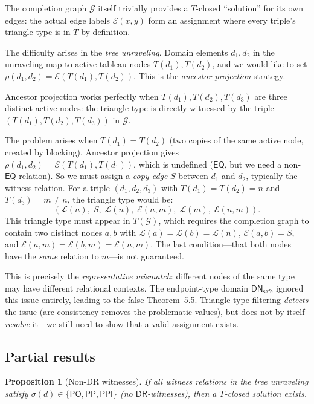 \documentclass[a4paper,11pt]{article}
\newtheorem{proposition}[theorem]{Proposition}
\theoremstyle{definition}
\newcommand{\DR}{\ensuremath{\mathsf{DR}}}
\newcommand{\PO}{\ensuremath{\mathsf{PO}}}
\newcommand{\EQ}{\ensuremath{\mathsf{EQ}}}
\newcommand{\PP}{\ensuremath{\mathsf{PP}}}
\newcommand{\PPI}{\ensuremath{\mathsf{PPI}}}
\newcommand{\DN}{\ensuremath{\mathsf{DN}}}
\begin{document}
The completion graph $\mathcal{G}$ itself trivially provides a
$T$-closed ``solution'' for its own edges: the actual edge labels
$\mathcal{E}(x, y)$ form an assignment where every triple's triangle
type is in $T$ by definition.

The difficulty arises in the \emph{tree unraveling}.  Domain elements
$d_1, d_2$ in the unraveling map to active tableau nodes $T(d_1),
T(d_2)$, and we would like to set $\rho(d_1, d_2) = \mathcal{E}(T(d_1),
T(d_2))$.  This is the \emph{ancestor projection} strategy.

Ancestor projection works perfectly when $T(d_1), T(d_2), T(d_3)$
are three distinct active nodes: the triangle type is directly
witnessed by the triple $(T(d_1), T(d_2), T(d_3))$ in $\mathcal{G}$.

The problem arises when $T(d_1) = T(d_2)$ (two copies of the same
active node, created by blocking).  Ancestor projection gives
$\rho(d_1, d_2) = \mathcal{E}(T(d_1), T(d_1))$, which is undefined
($\EQ$, but we need a non-$\EQ$ relation).  So we must assign a
\emph{copy edge} $S$ between $d_1$ and $d_2$, typically the witness
relation.  For a triple $(d_1, d_2, d_3)$ with $T(d_1) = T(d_2) = n$
and $T(d_3) = m \neq n$, the triangle type would be:
\[
  (\mathcal{L}(n),\; S,\; \mathcal{L}(n),\;
   \mathcal{E}(n, m),\; \mathcal{L}(m),\;
   \mathcal{E}(n, m)).
\]
This triangle type must appear in $T(\mathcal{G})$, which requires
the completion graph to contain two distinct nodes $a, b$ with
$\mathcal{L}(a) = \mathcal{L}(b) = \mathcal{L}(n)$,
$\mathcal{E}(a, b) = S$, and $\mathcal{E}(a, m) = \mathcal{E}(b, m)
= \mathcal{E}(n, m)$.  The last condition---that both nodes have the
\emph{same} relation to $m$---is not guaranteed.

This is precisely the \emph{representative mismatch}: different nodes
of the same type may have different relational contexts.  The
endpoint-type domain $\DN_{\mathsf{safe}}$ ignored this issue
entirely, leading to the false Theorem~5.5.  Triangle-type filtering
\emph{detects} the issue (arc-consistency removes the problematic
values), but does not by itself \emph{resolve} it---we still need to
show that a valid assignment exists.

\subsection{Partial results}

\begin{proposition}[Non-DR witnesses]
\label{prop:non-DR}
If all witness relations in the tree unraveling satisfy $\sigma(d)
\in \{\PO, \PP, \PPI\}$ \textup{(}no $\DR$-witnesses\textup{)},
then a $T$-closed solution exists.
\end{proposition}
\end{document}
